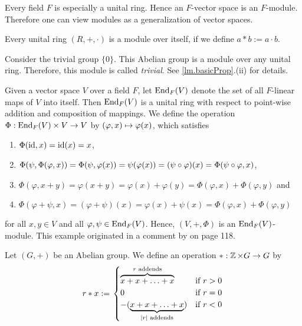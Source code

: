 \begin{exam}\label{ex.module}
\begin{exlist}
\item Every field $F$ is especially a unital ring. Hen\-ce an $F$-vector space is an $F$-module.
Therefore one can view modules as a generalization of vector spaces.
\item Every unital ring $(R,+,\cdot)$ is a module over itself, if we define $a\ast b:= a\cdot b$. \label{ex.RingAsModule}
\item Consider the trivial group $\lbrace 0\rbrace$. This Abelian group is a module over any unital ring. Therefore, this module is called \emph{trivial}. See \cref{lm.basicProp}.(ii) for details.
\item Given a vector space $V$ over a field $F$, let $\operatorname{\mathrm{End}}_F(V)$ denote the set of all $F$-linear maps of $V$ into itself. Then $\operatorname{\mathrm{End}}_F(V)$ is a unital ring with respect to point-wise addition and composition of mappings. We define the operation $\Phi:\operatorname{\mathrm{End}}_F(V)\times V \rightarrow V$ by $(\varphi,x) \mapsto \varphi(x)$, which satisfies
\begin{enumerate}
\item $\Phi(\operatorname{id}, x)=\operatorname{id}(x)=x$,
\item $\Phi(\psi,\Phi(\varphi,x))=\Phi(\psi,\varphi (x))=\\
\psi(\varphi(x))=(\psi\circ\varphi)(x)=\Phi(\psi\circ\varphi,x)$,
\item $\Phi(\varphi,x+y)=\varphi(x+y)=\varphi(x)+\varphi(y)=\Phi (\varphi,x)+\Phi (\varphi,y)$ and
\item $\Phi(\varphi+\psi,x)=(\varphi+\psi)(x)=\varphi(x)+\psi(x)=\Phi(\varphi,x)+\Phi (\varphi,y)$
\end{enumerate}
for all $x,y\in V$ and all $\varphi, \psi \in \operatorname{\mathrm{End}}_F(V)$. Hence, $(V,+,\Phi)$ is an $\operatorname{\mathrm{End}}_F(V)$-module. This example originated in a comment by \cite{lang2002algebra} on page 118.\label{exam.Vector Space as EndFV-module}
\item \label{ex.Z module} Let $(G,+)$ be an Abelian group. We define an operation $\ast : \operatorname{\mathbb{Z}}\times G \rightarrow G$ by
\begin{equation*}
r\ast x:=\left. \begin{cases}
\overbrace{x+x+\ldots+x}^{r \textnormal{ addends}} & \textnormal{if } r>0 \\ 
0 & \textnormal{if } r=0\\ 
-(\underbrace{x+x+\ldots+x}_{\lvert r\rvert \textnormal{ addends}}) & \textnormal{if } r<0
\end{cases} \right.

\end{equation*}
\end{exlist}
\end{exam}

